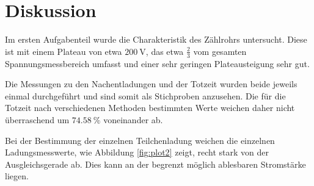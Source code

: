 \section{Diskussion}
\label{sec:Diskussion}

Im ersten Aufgabenteil wurde die Charakteristik des Zählrohrs untersucht.
Diese ist mit einem Plateau von etwa $\SI{200}{\volt}$, das etwa $\frac{2}{3}$
vom gesamten Spannungsmessbereich umfasst und einer sehr geringen Plateausteigung
sehr gut.

Die Messungen zu den Nachentladungen und der Totzeit wurden beide jeweils einmal
durchgeführt und sind somit als Stichproben anzusehen.
Die für die Totzeit nach verschiedenen Methoden bestimmten Werte weichen
daher nicht überraschend um $\SI{74.58}{\percent}$ voneinander ab.

Bei der Bestimmung der einzelnen Teilchenladung 
weichen die einzelnen Ladungsmesswerte, wie Abbildung \ref{fig:plot2} zeigt,
recht stark von der Ausgleichsgerade ab. Dies kann an der begrenzt möglich
ablesbaren Stromstärke liegen.


